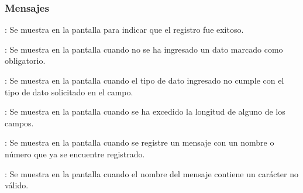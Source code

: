 \subsubsection{Mensajes}

\begin{Citemize}
	\item {}: Se muestra en la pantalla  para indicar que el registro fue exitoso.
	\item {}: Se muestra en la pantalla  cuando no se ha ingresado un dato marcado como obligatorio.
	\item {}: Se muestra en la pantalla  cuando el tipo de dato ingresado no cumple con el tipo de dato solicitado en el campo.
	\item {}: Se muestra en la pantalla  cuando se ha excedido la longitud de alguno de los campos.
	\item {}: Se muestra en la pantalla  cuando se registre un mensaje con un nombre o número que ya se encuentre registrado.
	\item {}: Se muestra en la pantalla  cuando el nombre del mensaje contiene un carácter no válido.
\end{Citemize}
